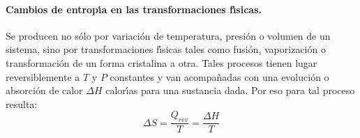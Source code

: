 \paragraph{Cambios de entrop\'{\i}a en las transformaciones f\'{\i}sicas.}
 Se producen no s\'olo por variaci\'on de temperatura, presi\'on o volumen de un sistema,  sino por transformaciones f\'{\i}sicas tales como fusi\'on, vaporizaci\'on o transformaci\'on de un forma cristalina a otra. Tales procesos tienen lugar reversiblemente a $T$ y $P$ constantes y van acompa\~nadas con una evoluci\'on o absorci\'on de calor $\Delta H$ calor\'{\i}as para una sustancia dada. Por eso  para tal proceso resulta:
\begin{equation}
\Delta S =  \frac{Q_{rev}}{T} = \frac{\Delta H}{T}
\end{equation}

